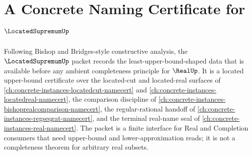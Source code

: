 \chapter{A Concrete Naming Certificate for $\LocatedSupremumUp$}
\label{ch:concrete-instances-locatedsupremum-namecert}

Following Bishop and Bridges-style constructive analysis, the $\LocatedSupremumUp$ packet records the least-upper-bound-shaped data that is available before any ambient completeness principle for $\RealUp$. It is a located upper-bound certificate over the located-cut and located-real surfaces of \autoref{ch:concrete-instances-locatedcut-namecert} and \autoref{ch:concrete-instances-locatedreal-namecert}, the comparison discipline of \autoref{ch:concrete-instances-bishoprealcomparison-namecert}, the regular-rational handoff of \autoref{ch:concrete-instances-regseqrat-namecert}, and the terminal real-name seal of \autoref{ch:concrete-instances-real-namecert}. The packet is a finite interface for Real and Completion consumers that need upper-bound and lower-approximation reads; it is not a completeness theorem for arbitrary real subsets.

